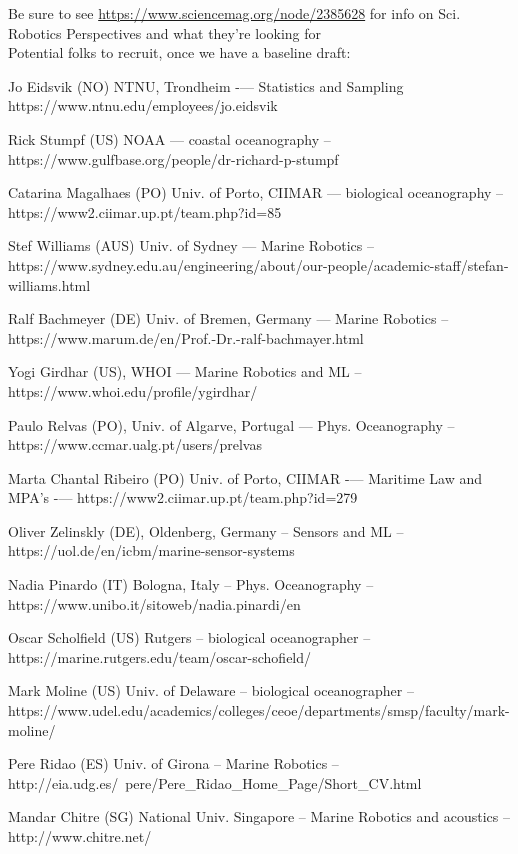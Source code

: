 \newpage
\large{Be sure to see \url{https://www.sciencemag.org/node/2385628}
  for info on
  Sci. Robotics Perspectives and what they're looking for}\\


Potential folks to recruit, once we have a baseline draft:

\begin{enumerate}[noitemsep,topsep=0pt,parsep=0pt,partopsep=0pt]
\footnotesize{  
\item Jo Eidsvik (NO) NTNU, Trondheim -— Statistics and Sampling https://www.ntnu.edu/employees/jo.eidsvik
\item Rick Stumpf (US) NOAA — coastal oceanography -- https://www.gulfbase.org/people/dr-richard-p-stumpf
\item Catarina Magalhaes (PO) Univ. of Porto, CIIMAR — biological oceanography -- https://www2.ciimar.up.pt/team.php?id=85
\item Stef Williams (AUS) Univ. of Sydney — Marine Robotics -- https://www.sydney.edu.au/engineering/about/our-people/academic-staff/stefan-williams.html
\item Ralf Bachmeyer (DE) Univ. of Bremen, Germany — Marine Robotics -- https://www.marum.de/en/Prof.-Dr.-ralf-bachmayer.html
\item Yogi Girdhar (US), WHOI — Marine Robotics and ML -- https://www.whoi.edu/profile/ygirdhar/
\item Paulo Relvas (PO), Univ. of Algarve, Portugal — Phys. Oceanography -- https://www.ccmar.ualg.pt/users/prelvas
\item Marta Chantal Ribeiro (PO) Univ. of Porto, CIIMAR -— Maritime Law and MPA’s -— https://www2.ciimar.up.pt/team.php?id=279
\item Oliver Zelinskly (DE), Oldenberg, Germany -- Sensors and ML -- https://uol.de/en/icbm/marine-sensor-systems
\item Nadia Pinardo (IT) Bologna, Italy -- Phys. Oceanography -- https://www.unibo.it/sitoweb/nadia.pinardi/en
\item Oscar Scholfield (US) Rutgers -- biological oceanographer -- https://marine.rutgers.edu/team/oscar-schofield/  
\item Mark Moline (US) Univ. of Delaware -- biological oceanographer -- https://www.udel.edu/academics/colleges/ceoe/departments/smsp/faculty/mark-moline/
\item Pere Ridao (ES) Univ. of Girona -- Marine Robotics -- http://eia.udg.es/~pere/Pere\_Ridao\_Home\_Page/Short\_CV.html
\item Mandar Chitre (SG) National Univ. Singapore -- Marine Robotics
  and acoustics -- http://www.chitre.net/

}
\end{enumerate}
